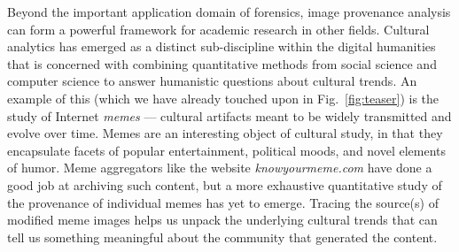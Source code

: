 Beyond the important application domain of forensics, image provenance analysis can form a powerful framework for academic research in other fields.
Cultural analytics has emerged as a distinct sub-discipline within the digital humanities~\cite{manovich2009cultural,yamaoka2011cultural} that is concerned with combining quantitative methods from social science and computer science to answer humanistic questions about cultural trends.
An example of this (which we have already touched upon in Fig.~\ref{fig:teaser}) is the study of Internet \textit{memes} --- cultural artifacts meant to be widely transmitted and evolve over time.
Memes are an interesting object of cultural study, in that they encapsulate facets of popular entertainment, political moods, and novel elements of humor.
Meme aggregators like the website \emph{knowyourmeme.com} have done a good job at archiving such content, but a more exhaustive quantitative study of the provenance of individual memes has yet to emerge.
Tracing the source(s) of modified meme images helps us unpack the underlying cultural trends that can tell us something meaningful about the community that generated the content.



